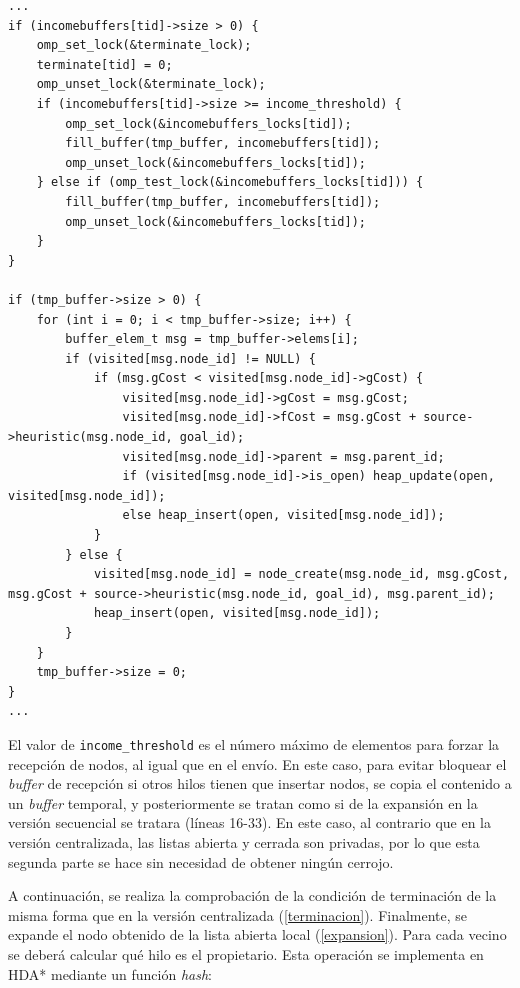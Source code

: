 \documentclass[a4paper,12pt]{article}
\begin{document}
{
\begin{lstlisting}
...
if (incomebuffers[tid]->size > 0) {
    omp_set_lock(&terminate_lock);
    terminate[tid] = 0;
    omp_unset_lock(&terminate_lock);
    if (incomebuffers[tid]->size >= income_threshold) {
        omp_set_lock(&incomebuffers_locks[tid]);
        fill_buffer(tmp_buffer, incomebuffers[tid]);
        omp_unset_lock(&incomebuffers_locks[tid]);
    } else if (omp_test_lock(&incomebuffers_locks[tid])) {
        fill_buffer(tmp_buffer, incomebuffers[tid]);
        omp_unset_lock(&incomebuffers_locks[tid]);
    }
}

if (tmp_buffer->size > 0) {
    for (int i = 0; i < tmp_buffer->size; i++) {
        buffer_elem_t msg = tmp_buffer->elems[i];
        if (visited[msg.node_id] != NULL) {
            if (msg.gCost < visited[msg.node_id]->gCost) {
                visited[msg.node_id]->gCost = msg.gCost;
                visited[msg.node_id]->fCost = msg.gCost + source->heuristic(msg.node_id, goal_id);
                visited[msg.node_id]->parent = msg.parent_id;
                if (visited[msg.node_id]->is_open) heap_update(open, visited[msg.node_id]);
                else heap_insert(open, visited[msg.node_id]);
            }
        } else {
            visited[msg.node_id] = node_create(msg.node_id, msg.gCost, msg.gCost + source->heuristic(msg.node_id, goal_id), msg.parent_id);
            heap_insert(open, visited[msg.node_id]);
        }
    }
    tmp_buffer->size = 0;
}
...
\end{lstlisting}
}

\noindent El valor de \verb|income_threshold| es el número máximo de elementos para forzar la recepción de nodos, al igual que en el envío. En este caso, para evitar bloquear el \textit{buffer} de recepción si otros hilos tienen que insertar nodos, se copia el contenido a un \textit{buffer} temporal, y posteriormente se tratan como si de la expansión en la versión secuencial se tratara (líneas 16-33). En este caso, al contrario que en la versión centralizada, las listas abierta y cerrada son privadas, por lo que esta segunda parte se hace sin necesidad de obtener ningún cerrojo.

A continuación, se realiza la comprobación de la condición de terminación de la misma forma que en la versión centralizada (\ref{terminacion}). Finalmente, se expande el nodo obtenido de la lista abierta local (\ref{expansion}). Para cada vecino se deberá calcular qué hilo es el propietario. Esta operación se implementa en HDA* mediante un función \textit{hash}:
\end{document}
